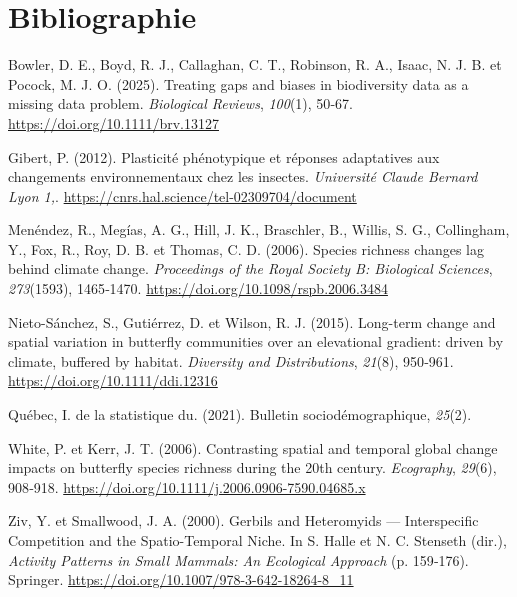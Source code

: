 \documentclass[9pt,twocolumn,twoside,]{pnas-new}
\newlength{\cslhangindent}
\newenvironment{CSLReferences}[2] %
 {\begin{list}{}{%
  \setlength{\itemindent}{0pt}
  \setlength{\leftmargin}{0pt}
  \setlength{\parsep}{0pt}
  \ifodd #1
   \setlength{\leftmargin}{\cslhangindent}
   \setlength{\itemindent}{-1\cslhangindent}
  \fi
  \setlength{\itemsep}{#2\baselineskip}}}
 {\end{list}}
\begin{document}
\section*{Bibliographie}\label{bibliographie}

\label{refs}
\begin{CSLReferences}{1}{0}
Bowler, D. E., Boyd, R. J., Callaghan, C. T., Robinson, R. A., Isaac, N.
J. B. et Pocock, M. J. O. (2025). Treating gaps and biases in
biodiversity data as a missing data problem. \emph{Biological Reviews},
\emph{100}(1), 50‑67. \url{https://doi.org/10.1111/brv.13127}

Gibert, P. (2012). Plasticité phénotypique et réponses adaptatives aux
changements environnementaux chez les insectes. \emph{Université Claude
Bernard Lyon 1,}. \url{https://cnrs.hal.science/tel-02309704/document}

Menéndez, R., Megías, A. G., Hill, J. K., Braschler, B., Willis, S. G.,
Collingham, Y., Fox, R., Roy, D. B. et Thomas, C. D. (2006). Species
richness changes lag behind climate change. \emph{Proceedings of the
Royal Society B: Biological Sciences}, \emph{273}(1593), 1465‑1470.
\url{https://doi.org/10.1098/rspb.2006.3484}

Nieto-Sánchez, S., Gutiérrez, D. et Wilson, R. J. (2015). Long-term
change and spatial variation in butterfly communities over an
elevational gradient: driven by climate, buffered by habitat.
\emph{Diversity and Distributions}, \emph{21}(8), 950‑961.
\url{https://doi.org/10.1111/ddi.12316}

Québec, I. de la statistique du. (2021). Bulletin sociodémographique,
\emph{25}(2).

White, P. et Kerr, J. T. (2006). Contrasting spatial and temporal global
change impacts on butterfly species richness during the 20th century.
\emph{Ecography}, \emph{29}(6), 908‑918.
\url{https://doi.org/10.1111/j.2006.0906-7590.04685.x}

Ziv, Y. et Smallwood, J. A. (2000). Gerbils and {Heteromyids} ---
{Interspecific} {Competition} and the {Spatio}-{Temporal} {Niche}. In S.
Halle et N. C. Stenseth (dir.), \emph{Activity {Patterns} in {Small}
{Mammals}: {An} {Ecological} {Approach}} (p. 159‑176). Springer.
\url{https://doi.org/10.1007/978-3-642-18264-8_11}

\end{CSLReferences}



% 
\end{document}
